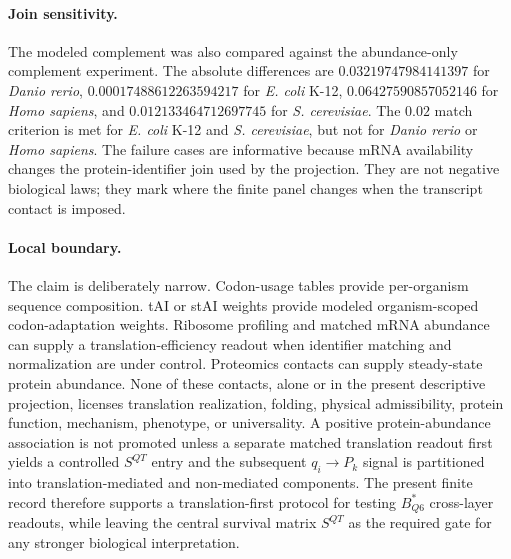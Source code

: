 \paragraph{Join sensitivity.}
The modeled complement was also compared against the abundance-only complement experiment. The absolute differences are $0.03219747984141397$ for \emph{Danio rerio}, $0.00017488612263594217$ for \emph{E. coli} K-12, $0.06427590857052146$ for \emph{Homo sapiens}, and $0.012133464712697745$ for \emph{S. cerevisiae}. The $0.02$ match criterion is met for \emph{E. coli} K-12 and \emph{S. cerevisiae}, but not for \emph{Danio rerio} or \emph{Homo sapiens}. The failure cases are informative because mRNA availability changes the protein-identifier join used by the projection. They are not negative biological laws; they mark where the finite panel changes when the transcript contact is imposed.

\paragraph{Local boundary.}
The claim is deliberately narrow. Codon-usage tables provide per-organism sequence composition. tAI or stAI weights provide modeled organism-scoped codon-adaptation weights. Ribosome profiling and matched mRNA abundance can supply a translation-efficiency readout when identifier matching and normalization are under control. Proteomics contacts can supply steady-state protein abundance. None of these contacts, alone or in the present descriptive projection, licenses translation realization, folding, physical admissibility, protein function, mechanism, phenotype, or universality. A positive protein-abundance association is not promoted unless a separate matched translation readout first yields a controlled $S^{QT}$ entry and the subsequent $q_i\to P_k$ signal is partitioned into translation-mediated and non-mediated components. The present finite record therefore supports a translation-first protocol for testing $B^*_{Q6}$ cross-layer readouts, while leaving the central survival matrix $S^{QT}$ as the required gate for any stronger biological interpretation.
